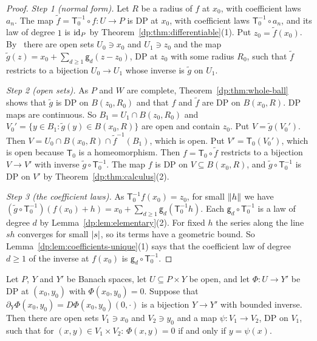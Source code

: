 \begin{proof}
\emph{Step 1 (normal form).} Let $R$ be a radius of $f$ at $x_0$, with coefficient laws $a_n$. The map $\tilde f=\mathsf T_0^{-1}\circ f\colon U\to P$ is DP at $x_0$, with coefficient laws $\mathsf T_0^{-1}\circ a_n$, and its law of degree $1$ is $\mathrm{id}_P$ by Theorem~\ref{dp:thm:differentiable}(1). Put $z_0=\tilde f(x_0)$. By~\cite[Lemma~Q.14]{I} there are open sets $U_0\ni x_0$ and $U_1\ni z_0$ and the map $\tilde g(z)=x_0+\sum_{d\ge1}\mathsf g_d(z-z_0)$, DP at $z_0$ with some radius $R_0$, such that $\tilde f$ restricts to a bijection $U_0\to U_1$ whose inverse is $\tilde g$ on $U_1$.

\emph{Step 2 (open sets).} As $P$ and $W$ are complete, Theorem~\ref{dp:thm:whole-ball} shows that $\tilde g$ is DP on $B(z_0,R_0)$ and that $f$ and $\tilde f$ are DP on $B(x_0,R)$. DP maps are continuous. So $B_1=U_1\cap B(z_0,R_0)$ and $V_0'=\{y\in B_1:\tilde g(y)\in B(x_0,R)\}$ are open and contain $z_0$. Put $V=\tilde g(V_0')$. Then $V=U_0\cap B(x_0,R)\cap\tilde f^{-1}(B_1)$, which is open. Put $V'=\mathsf T_0(V_0')$, which is open because $\mathsf T_0$ is a homeomorphism. Then $f=\mathsf T_0\circ\tilde f$ restricts to a bijection $V\to V'$ with inverse $\tilde g\circ\mathsf T_0^{-1}$. The map $f$ is DP on $V\subseteq B(x_0,R)$, and $\tilde g\circ\mathsf T_0^{-1}$ is DP on $V'$ by Theorem~\ref{dp:thm:calculus}(2).

\emph{Step 3 (the coefficient laws).} As $\mathsf T_0^{-1}f(x_0)=z_0$, for small $\lVert h\rVert$ we have $(\tilde g\circ\mathsf T_0^{-1})(f(x_0)+h)=x_0+\sum_{d\ge1}\mathsf g_d(\mathsf T_0^{-1}h)$. Each $\mathsf g_d\circ\mathsf T_0^{-1}$ is a law of degree $d$ by Lemma~\ref{dp:lem:elementary}(2). For fixed $h$ the series along the line $sh$ converges for small $\lvert s\rvert$, so its terms have a geometric bound. So Lemma~\ref{dp:lem:coefficients-unique}(1) says that the coefficient law of degree $d\ge1$ of the inverse at $f(x_0)$ is $\mathsf g_d\circ\mathsf T_0^{-1}$.
\end{proof}

\begin{corollary}\label{dp:cor:implicit}
Let $P$, $Y$ and $Y'$ be Banach spaces, let $U\subseteq P\times Y$ be open, and let $\Phi\colon U\to Y'$ be DP at $(x_0,y_0)$ with $\Phi(x_0,y_0)=0$. Suppose that $\partial_Y\Phi(x_0,y_0)=D\Phi(x_0,y_0)(0,\cdot)$ is a bijection $Y\to Y'$ with bounded inverse. Then there are open sets $V_1\ni x_0$ and $V_2\ni y_0$ and a map $\psi\colon V_1\to V_2$, DP on $V_1$, such that for $(x,y)\in V_1\times V_2$: $\Phi(x,y)=0$ if and only if $y=\psi(x)$.
\end{corollary}

